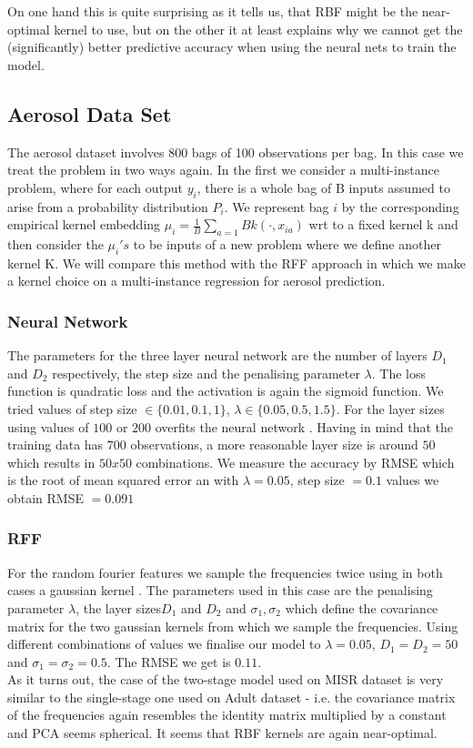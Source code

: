\documentclass{article} %
\begin{document}
On one hand this is quite surprising as it tells us, that RBF might be the near-optimal kernel to use, but on the other it at least explains why we cannot get the (significantly) better predictive accuracy when using the neural nets to train the model.


\subsection{Aerosol Data Set}
The aerosol dataset involves 800 bags of 100 observations per bag.  In this case we treat the problem in two ways again. In the first we consider a multi-instance problem, where for each output $y_{i}$, there is a whole bag of B inputs assumed to arise from a probability distribution $P_{i}$. We represent  bag $i$ by the corresponding 
empirical kernel embedding $\mu_{i} = \frac{1}{B} \sum_{a=1}{B} k( \cdot, x_{ia})$ wrt to a fixed kernel k and then consider the $\mu_{i} 's$ to be inputs of a new problem where we define another kernel K. 
We will compare this method with the RFF approach in which we make a kernel choice on a multi-instance regression for
aerosol prediction. 
\subsubsection{Neural Network}
The parameters for the three layer neural network are the number of layers $D_1$ and $D_2$ respectively, the step size and the penalising parameter $\lambda$. The loss function is quadratic loss and the activation is again the sigmoid function. We tried values of step size $\in \{  0.01, 0.1, 1\}$, $\lambda \in \{ 0.05, 0.5, 1.5 \}$. For the layer sizes using values of $100$ or $200$ overfits the neural network . Having in mind that the training data has $700$ observations, a more reasonable layer size is around $50$ which results in $50 x 50$ combinations. We measure the accuracy by RMSE which is the root of mean squared error an with $\lambda = 0.05$, step size $ = 0.1$ values we obtain RMSE $=0.091$  
\subsubsection{ RFF}
For the random fourier features we sample the frequencies twice using in both cases a gaussian kernel . The parameters used in this case are the penalising parameter $\lambda$, the layer sizes$D_1$ and $D_2$ and $\sigma_1, \sigma_2$ which define the covariance matrix for the two gaussian kernels from which we sample the frequencies. Using different combinations of values we finalise our model to $\lambda= 0.05$, $D_1=D_2=50$ and $\sigma_1=\sigma_2 = 0.5$. The RMSE we get is $0.11$.\\
As it turns out, the case of the two-stage model used on MISR dataset is very similar to the single-stage one used on Adult dataset - i.e. the covariance matrix of the frequencies again resembles the identity matrix multiplied by a constant and PCA seems spherical. It seems that RBF kernels are again near-optimal.
\end{document}
